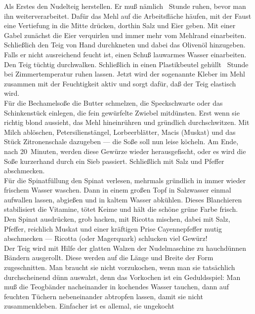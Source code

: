 
      \begin{zubereitung}
        Als Erstes den Nudelteig herstellen. Er muß nämlich \breh{}~Stunde
	ruhen, bevor man ihn weiterverarbeitet. Dafür das Mehl auf die
	Arbeitsfläche häufen, mit der Faust eine Vertiefung in die Mitte
	drücken, dorthin Salz und Eier geben. Mit einer Gabel zunächst die Eier
	verquirlen und immer mehr vom Mehlrand einarbeiten. Schließlich den
	Teig von Hand durchkneten und dabei das Olivenöl hinzugeben. Falls er
	nicht ausreichend feucht ist, einen Schuß lauwarmes Wasser einarbeiten.
	\\
	Den Teig tüchtig durchwalken. Schließlich in einen Plastikbeutel
	gehüllt \breh{}~Stunde bei Zimmertemperatur ruhen lassen. Jetzt
	wird der sogenannte Kleber im Mehl zusammen mit der Feuchtigkeit aktiv
	und sorgt dafür, daß der Teig elastisch wird. \\
	Für die Bechamelsoße die Butter schmelzen, die Speckschwarte oder das
	Schinkenstück einlegen, die fein gewürfelte Zwiebel mitdünsten. Erst
	wenn sie richtig blond aussieht, das Mehl hineinrühren und gründlich
	durchschwitzen. Mit Milch ablöschen, Petersilienstängel,
	Lorbeerblätter, Macis (Muskat) und das Stück Zitronenschale dazugeben
	--- die Soße soll nun leise köcheln. Am Ende, nach 20~Minuten, werden
	diese Gewürze wieder herausgefischt, oder es wird die Soße kurzerhand
	durch ein Sieb passiert. Schließlich mit Salz und Pfeffer abschmecken.
	\\
	Für die Spinatfüllung den Spinat verlesen, mehrmals gründlich in immer
	wieder frischem Wasser waschen. Dann in einem großen Topf in Salzwasser
	einmal aufwallen lassen, abgießen und in kaltem Wasser abkühlen. Dieses
	Blanchieren stabilisiert die Vitamine, tötet Keime und hält die schöne
	grüne Farbe frisch. \\
	Den Spinat ausdrücken, grob hacken, mit Ricotta mischen, dabei mit
	Salz, Pfeffer, reichlich Muskat und einer kräftigen Prise
	Cayennepfeffer mutig abschmecken --- Ricotta (oder Magerquark)
	schlucken viel Gewürz! \\
	Der Teig wird mit Hilfe der glatten Walzen der Nudelmaschine zu
	hauchdünnen Bändern ausgerollt. Diese werden auf die Länge und Breite
	der Form zugeschnitten. Man braucht sie nicht vorzukochen, wenn man sie
	tatsächlich durchscheinend dünn auswalzt, denn das Vorkochen ist ein
	Geduldsspiel: Man muß die Teogbänder nacheinander in kochendes Wasser
	tauchen, dann auf feuchten Tüchern nebeneinander abtropfen lassen,
	damit sie nicht zusammenkleben. Einfacher ist es allemal, sie ungekocht

\end{zubereitung}
